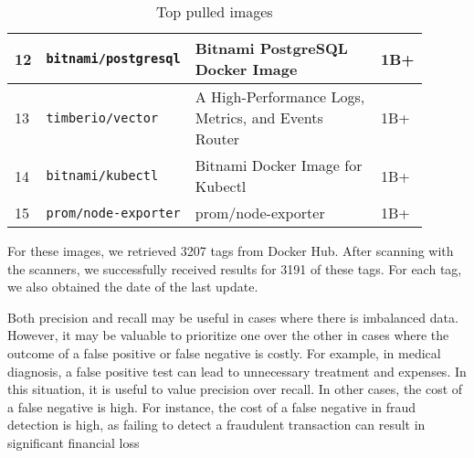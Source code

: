 \begin{table}[h]
\begin{tabular}{| p{0.02\linewidth} | p{0.3\linewidth} | p{0.5\linewidth} | p{0.08\linewidth} |}
        12 & \texttt{bitnami/postgresql}    & Bitnami PostgreSQL Docker Image                                                                 & 1B+   \\ \hline
        13 & \texttt{timberio/vector}       & A High-Performance Logs, Metrics, and Events Router                                             & 1B+   \\ \hline
        14 & \texttt{bitnami/kubectl}       & Bitnami Docker Image for Kubectl                                                                & 1B+   \\ \hline
        15 & \texttt{prom/node-exporter}    & prom/node-exporter                                                                              & 1B+   \\ \hline
    \end{tabular}
    \caption{Top pulled images}
    \label{tab:topimages}
\end{table}



For these images, we retrieved 3207 tags from Docker Hub. After scanning with the scanners, we successfully received results for 3191 of these tags. For each tag, we also obtained the date of the last update.








Both precision and recall may be useful in cases where there is imbalanced data. However, it may be valuable to prioritize one over the other in cases where the outcome of a false positive or false negative is costly. For example, in medical diagnosis, a false positive test can lead to unnecessary treatment and expenses. In this situation, it is useful to value precision over recall. In other cases, the cost of a false negative is high. For instance, the cost of a false negative in fraud detection is high, as failing to detect a fraudulent transaction can result in significant financial loss


